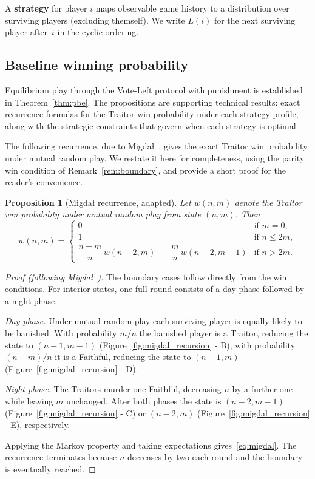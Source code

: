 \documentclass[11pt,a4paper]{article}
\newtheorem{proposition}{Proposition}
\begin{document}
A \textbf{strategy} for player \(i\) maps observable game history to a
distribution over surviving players (excluding themself). We write \(L(i)\) for
the next surviving player after~\(i\) in the cyclic ordering.

\subsection{Baseline winning probability}

Equilibrium play through the Vote-Left protocol with punishment is established
in Theorem~\ref{thm:pbe}. The
propositions are supporting technical results: exact recurrence
formulas for the Traitor win probability under each strategy profile,
along with the strategic constraints that govern when each strategy is
optimal.

The following recurrence, due to Migda\l{}~\cite{migdal2010}, gives the
exact Traitor win probability under mutual random play. We restate it here
for completeness, using the parity win condition of
Remark~\ref{rem:boundary}, and provide a short proof for the reader's
convenience.

\begin{proposition}[Migda\l{} recurrence, adapted]\label{prop:migdal}
Let \(w(n,m)\) denote the Traitor win probability under mutual random play from
state \((n,m)\).  Then
\begin{equation}\label{eq:migdal}
w(n,m) = \begin{cases}
  0 & \text{if } m = 0, \\
  1 & \text{if } n \leq 2m, \\[4pt]
  \dfrac{n-m}{n}\,w(n-2,m) \;+\; \dfrac{m}{n}\,w(n-2,m-1) & \text{if } n > 2m.
\end{cases}
\end{equation}
\end{proposition}

\begin{proof}[Proof (following Migda\l{}~\cite{migdal2010})]
The boundary cases follow directly from the win conditions.  For interior
states, one full round consists of a day phase followed by a night phase.

\textit{Day phase.}  Under mutual random play each surviving player is equally
likely to be banished.  With probability \(m/n\) the banished player is a Traitor,
    reducing the state to \((n-1, m-1)\) (Figure~\ref{fig:migdal_recursion} - B); with probability \((n-m)/n\) it is a
Faithful, reducing the state to \((n-1, m)\) (Figure~\ref{fig:migdal_recursion} - D).

\textit{Night phase.}  The Traitors murder one Faithful, decreasing \(n\) by a
further one while leaving \(m\) unchanged.  After both phases the state is
\((n-2, m-1)\) (Figure~\ref{fig:migdal_recursion} - C) or \((n-2, m)\) (Figure~\ref{fig:migdal_recursion} - E), respectively.

Applying the Markov property and taking expectations gives~\eqref{eq:migdal}.
The recurrence terminates because \(n\) decreases by two each round and the
boundary is eventually reached.
\end{proof}
\end{document}
